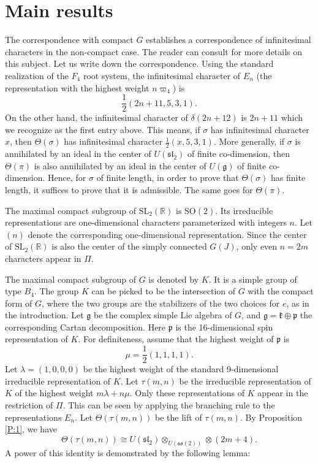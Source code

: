 \documentclass[11pt]{amsart}
\theoremstyle{plain}
\numberwithin{equation}{section}
\newcommand{\SL}{{\mathrm{SL}}}
\newcommand{\SO}{{\mathrm{SO}}}
\begin{document}
\section{Main results} 
The correspondence with compact $G$ establishes a correspondence of infinitesimal characters in the non-compact case. The reader can consult \cite{Li} for more details on this subject. 
Let us write down the correspondence. Using the standard 
realization of the $F_4$ root system, the infinitesimal character of $E_n$ (the representation with the highest weight $n\varpi_4$) is 
\[ 
\frac{1}{2}(2n+11, 5,3,1).  
\] 
On the other hand, the infinitesimal character of $\delta(2n+12)$ is $2n+11$ which we recognize as the first entry above. 
This means, if $\sigma$ has infinitesimal character $x$, then $\Theta(\sigma)$ has infinitesimal character $\frac{1}{2}( x, 5,3,1)$.  More generally, if $\sigma$ is annihilated 
by an ideal in the center of $U(\mathfrak{sl}_2)$ of finite co-dimension, then $\Theta(\pi)$ is also annihilated by an ideal in the center of $U(\mathfrak g)$ of finite co-dimension. 
Hence,  for $\sigma$ of finite length, in order to prove that $\Theta(\sigma)$ has finite length, it suffices to prove that it is admissible. The same goes for $\Theta(\pi)$.   
 
 
\smallskip 


The maximal compact subgroup of $\SL_2(\mathbb R)$ is $\SO(2)$. Its irreducible representations are one-dimensional characters 
parameterized with integers $n$. Let $(n)$ denote the corresponding one-dimensional representation. 
Since the center of $\SL_2(\mathbb R)$ is also the center of 
the simply connected $G(J)$, only even $n=2m$ characters appear in $\Pi$.  

\smallskip 
 
 The maximal compact subgroup of $G$ is denoted by $K$. It is a simple group of 
 type $B_4$. The group $K$ can be picked to be the intersection of $G$ with the compact form of $G$,  
 where the two groups are the stabilizers of  the two choices for $e$, as in the introduction. 
  Let  $\mathfrak g$ be the complex simple Lie algebra of $G$, and 
 $\mathfrak g=\mathfrak k \oplus \mathfrak p$ the  corresponding Cartan decomposition. 
  Here  $\mathfrak p$ is the 16-dimensional spin representation of $K$.  
  For definiteness, assume that the highest weight of $\mathfrak p$ is 
\[ 
\mu=\frac{1}{2}(1,1,1,1). 
\] 
Let $\lambda=(1,0,0,0)$ be the highest weight of the standard 9-dimensional irreducible representation of $K$. 
Let $\tau(m,n)$ be the irreducible representation of $K$ of the highest weight $m\lambda + n\mu$. Only these representations 
of $K$ appear in the restriction of $\Pi$.  This can be seen by applying the branching rule \cite{Lep} to the representations $E_n$.  
 Let $\Theta(\tau(m,n))$ be the lift of $\tau(m,n)$. 
By Proposition \ref{P:1}, we have 
\[  
\Theta(\tau(m,n))\cong U(\mathfrak{sl}_2) \otimes_{U(\mathfrak{so}(2))} \otimes ( 2m+4). 
\] 
A power of this identity is demonstrated by the following lemma:  
\end{document}
